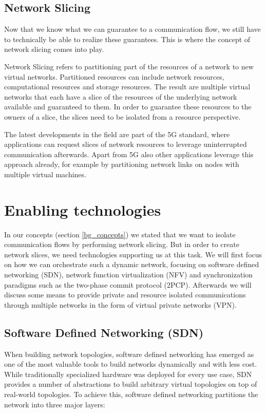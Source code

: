 \subsection{Network Slicing}
Now that we know what we can guarantee to a communication flow, we still have to technically be able to realize these guarantees. This is where the concept of network slicing comes into play.

Network Slicing \cite{slicing} refers to partitioning part of the resources of a network to new virtual networks. Partitioned resources can include network resources, computational resources and storage resources. The result are multiple virtual networks that each have a slice of the resources of the underlying network available and guaranteed to them. In order to guarantee these resources to the owners of a slice, the slices need to be isolated from a resource perspective.

The latest developments in the field are part of the 5G standard, where applications can request slices of network resources to leverage uninterrupted communication afterwards. Apart from 5G also other applications leverage this approach already, for example by partitioning network links on nodes with multiple virtual machines.

\section{Enabling technologies}
In our concepts (section \ref{bg_concepts}) we stated that we want to isolate communication flows by performing network slicing. But in order to create network slices, we need technologies supporting us at this task. We will first focus on how we can orchestrate such a dynamic network, focusing on software defined networking (SDN), network function virtualization (NFV) and synchronization paradigms such as the two-phase commit protocol (2PCP). Afterwards we will discuss some means to provide private and resource isolated communications through multiple networks in the form of virtual private networks (VPN).

\subsection{Software Defined Networking (SDN)}
When building network topologies, software defined networking \cite{sdn} has emerged as one of the most valuable tools to build networks dynamically and with less cost.
While traditionally specialized hardware was deployed for every use case, SDN provides a number of abstractions to build arbitrary virtual topologies on top of real-world topologies.
To achieve this, software defined networking partitions the network into three major layers:

